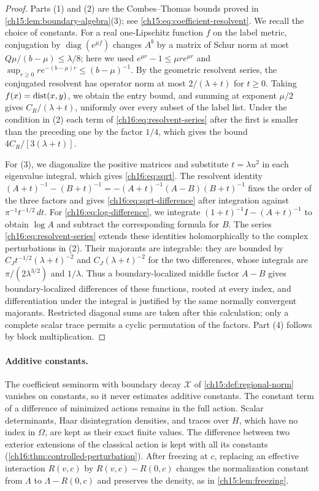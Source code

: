 \begin{proof}
Parts (1) and (2) are the Combes--Thomas bounds proved in \cref{ch15:lem:boundary-algebra}(3); see \eqref{ch15:eq:coefficient-resolvent}. We recall the choice of constants. For a real one-Lipschitz function $f$ on the label metric, conjugation by $\operatorname{diag}(e^{\mu f})$ changes $A^b$ by a matrix of Schur norm at most $Q\mu/(b-\mu)\le\lambda/8$; here we used $e^{\mu r}-1\le\mu re^{\mu r}$ and $\sup_{r\ge0}re^{-(b-\mu)r}\le(b-\mu)^{-1}$. By the geometric resolvent series, the conjugated resolvent has operator norm at most $2/(\lambda+t)$ for $t\ge0$. Taking $f(x)=\operatorname{dist}(x,y)$, we obtain the entry bound, and summing at exponent $\mu/2$ gives $C_R/(\lambda+t)$, uniformly over every subset of the label list. Under the condition in (2) each term of \eqref{ch16:eq:resolvent-series} after the first is smaller than the preceding one by the factor $1/4$, which gives the bound $4C_R/[3(\lambda+t)]$.

For (3), we diagonalize the positive matrices and substitute $t=\lambda u^2$ in each eigenvalue integral, which gives \eqref{ch16:eq:sqrt}. The resolvent identity $(A+t)^{-1}-(B+t)^{-1}=-(A+t)^{-1}(A-B)(B+t)^{-1}$ fixes the order of the three factors and gives \eqref{ch16:eq:sqrt-difference} after integration against $\pi^{-1}t^{-1/2}\,dt$. For \eqref{ch16:eq:log-difference}, we integrate $(1+t)^{-1}I-(A+t)^{-1}$ to obtain $\log A$ and subtract the corresponding formula for $B$. The series \eqref{ch16:eq:resolvent-series} extends these identities holomorphically to the complex perturbations in (2). Their majorants are integrable: they are bounded by $C_Jt^{-1/2}(\lambda+t)^{-2}$ and $C_J(\lambda+t)^{-2}$ for the two differences, whose integrals are $\pi/(2\lambda^{3/2})$ and $1/\lambda$. Thus a boundary-localized middle factor $A-B$ gives boundary-localized differences of these functions, rooted at every index, and differentiation under the integral is justified by the same normally convergent majorants. Restricted diagonal sums are taken after this calculation; only a complete scalar trace permits a cyclic permutation of the factors. Part (4) follows by block multiplication.
\end{proof}

\paragraph{Additive constants.}
The coefficient seminorm with boundary decay $\mathcal X$ of \cref{ch15:def:regional-norm} vanishes on constants, so it never estimates additive constants. The constant term of a difference of minimized actions remains in the full action. Scalar determinants, Haar disintegration densities, and traces over $H$, which have no index in $\Omega$, are kept as their exact finite values. The difference between two exterior extensions of the classical action is kept with all its constants (\cref{ch16:thm:controlled-perturbation}). After freezing at $c$, replacing an effective interaction $R(v,c)$ by $R(v,c)-R(0,c)$ changes the normalization constant from $\Lambda$ to $\Lambda-R(0,c)$ and preserves the density, as in \cref{ch15:lem:freezing}.

